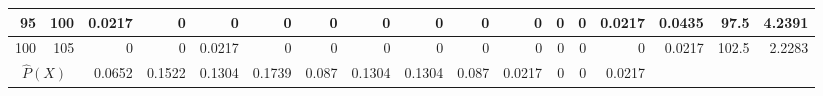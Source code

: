 \begin{table}[ht]
\begin{adjustbox}{width = \textwidth, center}
\begin{tabular}{|rr|r|r|r|r|r|r|r|r|r|r|r|r|r|r|r|}
            \rowcolor[HTML]{FFFFFF} 
            \cellcolor[HTML]{C8E4BE}95             & \cellcolor[HTML]{D9EAD3}100            & \cellcolor[HTML]{C7E9D8}0.0217                 & 0                                              & 0                                              & 0                                              & 0                                              & 0                                              & 0                                              & 0                                               & 0                                               & 0                                               & 0                                               & \cellcolor[HTML]{C7E9D8}0.0217                  & \cellcolor[HTML]{D9D2E9}0.0435                                                  & \cellcolor[HTML]{D9D2E9}97.5                                            & \cellcolor[HTML]{D9D2E9}4.2391                                                                   \\ \hline
            \rowcolor[HTML]{FFFFFF} 
            \cellcolor[HTML]{C8E4BE}100            & \cellcolor[HTML]{D9EAD3}105            & 0                                              & 0                                              & \cellcolor[HTML]{C7E9D8}0.0217                 & 0                                              & 0                                              & 0                                              & 0                                              & 0                                               & 0                                               & 0                                               & 0                                               & 0                                               & \cellcolor[HTML]{D9D2E9}0.0217                                                  & \cellcolor[HTML]{D9D2E9}102.5                                           & \cellcolor[HTML]{D9D2E9}2.2283                                                                   \\ \hline
            \multicolumn{2}{|c|}{\cellcolor[HTML]{FCE5CD}$\widehat{P}(X)$}                  & \cellcolor[HTML]{FCE5CD}0.0652                 & \cellcolor[HTML]{FCE5CD}0.1522                 & \cellcolor[HTML]{FCE5CD}0.1304                 & \cellcolor[HTML]{FCE5CD}0.1739                 & \cellcolor[HTML]{FCE5CD}0.087                  & \cellcolor[HTML]{FCE5CD}0.1304                 & \cellcolor[HTML]{FCE5CD}0.1304                 & \cellcolor[HTML]{FCE5CD}0.087                   & \cellcolor[HTML]{FCE5CD}0.0217                  & \cellcolor[HTML]{FCE5CD}0                       & \cellcolor[HTML]{FCE5CD}0                       & \cellcolor[HTML]{FCE5CD}0.0217                  & \multicolumn{1}{l|}{}                                                           & \multicolumn{1}{l|}{}                                                   & \multicolumn{1}{l|}{}                                                                            \\ \hline

\end{tabular}
\end{adjustbox}
\end{table}
